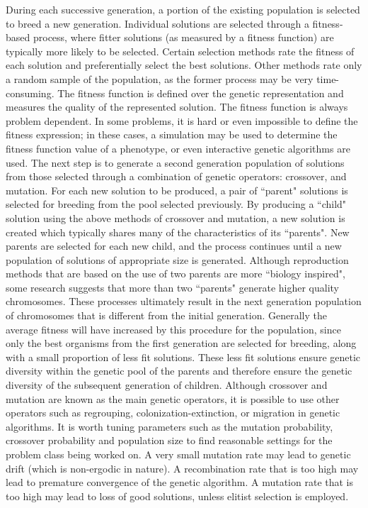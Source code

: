 During each successive generation, a portion of the existing population is selected to breed a new generation. Individual solutions are selected through a fitness-based process, where fitter solutions (as measured by a fitness function) are typically more likely to be selected. Certain selection methods rate the fitness of each solution and preferentially select the best solutions. Other methods rate only a random sample of the population, as the former process may be very time-consuming.
The fitness function is defined over the genetic representation and measures the quality of the represented solution. The fitness function is always problem dependent.
In some problems, it is hard or even impossible to define the fitness expression; in these cases, a simulation may be used to determine the fitness function value of a phenotype, or even interactive genetic algorithms are used.
The next step is to generate a second generation population of solutions from those selected through a combination of genetic operators: crossover, and mutation.
For each new solution to be produced, a pair of ``parent" solutions is selected for breeding from the pool selected previously. By producing a ``child" solution using the above methods of crossover and mutation, a new solution is created which typically shares many of the characteristics of its ``parents". New parents are selected for each new child, and the process continues until a new population of solutions of appropriate size is generated. Although reproduction methods that are based on the use of two parents are more ``biology inspired", some research suggests that more than two ``parents" generate higher quality chromosomes.
These processes ultimately result in the next generation population of chromosomes that is different from the initial generation. Generally the average fitness will have increased by this procedure for the population, since only the best organisms from the first generation are selected for breeding, along with a small proportion of less fit solutions. These less fit solutions ensure genetic diversity within the genetic pool of the parents and therefore ensure the genetic diversity of the subsequent generation of children.
Although crossover and mutation are known as the main genetic operators, it is possible to use other operators such as regrouping, colonization-extinction, or migration in genetic algorithms.
It is worth tuning parameters such as the mutation probability, crossover probability and population size to find reasonable settings for the problem class being worked on. A very small mutation rate may lead to genetic drift (which is non-ergodic in nature). A recombination rate that is too high may lead to premature convergence of the genetic algorithm. A mutation rate that is too high may lead to loss of good solutions, unless elitist selection is employed.
